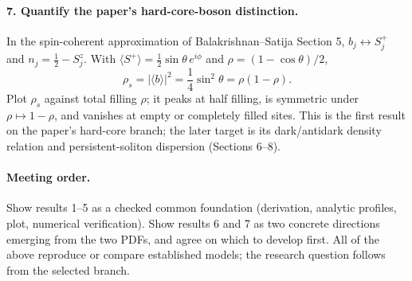 \documentclass[11pt,a4paper]{article}
\begin{document}
\paragraph{7. Quantify the paper's hard-core-boson distinction.}
In the spin-coherent approximation of Balakrishnan--Satija Section 5, $b_j\leftrightarrow S_j^+$ and $n_j=\frac12-S_j^z$. With $\langle S^+\rangle=\frac12\sin\theta\,e^{i\phi}$ and $\rho=(1-\cos\theta)/2$,
\[
\rho_s=|\langle b\rangle|^2=\frac14\sin^2\theta=\rho(1-\rho).
\]
Plot $\rho_s$ against total filling $\rho$; it peaks at half filling, is symmetric under $\rho\mapsto1-\rho$, and vanishes at empty or completely filled sites. This is the first result on the paper's hard-core branch; the later target is its dark/antidark density relation and persistent-soliton dispersion (Sections 6--8).

\paragraph{Meeting order.}
Show results 1--5 as a checked common foundation (derivation, analytic profiles, plot, numerical verification). Show results 6 and 7 as two concrete directions emerging from the two PDFs, and agree on which to develop first. All of the above reproduce or compare established models; the research question follows from the selected branch.
\end{document}
